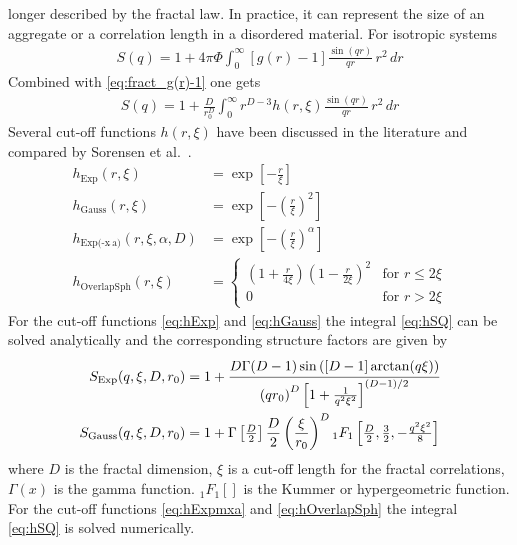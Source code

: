 longer described by the fractal law. In practice, it can
represent the size of an aggregate or a correlation
length in a disordered material.
For isotropic systems
\begin{align}
S(q) = 1+4\pi\Phi\int_0^\infty [g(r)-1] \frac{\sin(qr)}{qr} \, r^2 \, dr
\end{align}
Combined with \ref{eq:fract_g(r)-1} one gets
\begin{align}
S(q) = 1 +\frac{D}{r_0^D} \int_0^\infty r^{D-3} h(r,\xi)  \frac{\sin(qr)}{qr}\, r^2 \, dr
\label{eq:hSQ}
\end{align}
Several cut-off functions $h(r,\xi)$ have been discussed in the
literature and compared by Sorensen et al.\
\cite{Sorensen1999,Sorensen1992}.
\begin{align}
h_\text{Exp}(r,\xi)     &= \exp\left[-\tfrac{r}{\xi}\right] \label{eq:hExp}\\
h_\text{Gauss}(r,\xi)   &= \exp\left[-\left(\tfrac{r}{\xi}\right)^2\right] \label{eq:hGauss}\\
h_\text{Exp(-x$\hat{~}$a)}(r,\xi,\alpha,D) &= \exp\left[-\left(\tfrac{r}{\xi}\right)^\alpha\right] \label{eq:hExpmxa}\\
h_\text{OverlapSph}(r,\xi)   &=
\begin{cases}
\left(1+\frac{r}{4\xi}\right)\left(1-\frac{r}{2\xi}\right)^2
& \text{for } r\leq 2\xi \\
0 & \text{for } r>2\xi
\end{cases}
\label{eq:hOverlapSph}
\end{align}
For the cut-off functions \ref{eq:hExp} and \ref{eq:hGauss} the integral \ref{eq:hSQ} can be solved
analytically and the corresponding structure factors are given by
\begin{align}
S_\text{Exp}(q,\xi,D,r_0) &= 1 +  \cfrac{D \Gamma(D-1)
\sin\left([D-1]\arctan(q \xi)\right)}{\left( q r_0\right)^D
\left[1+\tfrac{1}{q^2\xi^2}\right]^{(D-1)/2}} \\
S_\text{Gauss}(q,\xi,D,r_0) &= 1 +
    \Gamma\left[\tfrac{D}{2}\right]\frac{D}{2}
    \left(\frac{\xi}{r_0}\right)^D
    {}_1F_1\left[\tfrac{D}{2},\tfrac{3}{2},-\tfrac{q^2\xi^2}{8}\right]
\end{align}
where $D$ is the fractal dimension, $\xi$ is a cut-off length for
the fractal correlations, $\Gamma(x)$ is the gamma function.
${}_1F_1\left[\right]$ is the Kummer or hypergeometric function. For
the cut-off functions \ref{eq:hExpmxa} and \ref{eq:hOverlapSph} the
integral \ref{eq:hSQ} is solved numerically.

